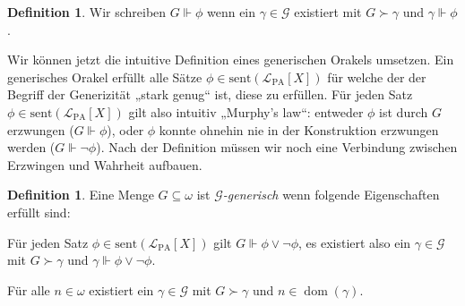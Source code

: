 \documentclass[nofonts]{uebung}
\theoremstyle{definition}
\newtheorem{definition}[theorem]{Definition}
\DeclareMathOperator{\dom}{dom}
\begin{document}
\begin{definition}
    Wir schreiben $G\Vdash \phi$ wenn ein $\gamma\in \mathcal G$ existiert mit $G\succ \gamma$ und $\gamma\Vdash\phi$.
\end{definition}

Wir können jetzt die intuitive Definition eines generischen Orakels umsetzen. Ein generisches Orakel erfüllt alle Sätze $\phi\in \mathrm{sent}(\mathcal L_{\mathrm{PA}}[X])$ für welche der der Begriff der Generizität „stark genug“ ist, diese zu erfüllen. Für jeden Satz $\phi\in \mathrm{sent}(\mathcal L_{\mathrm{PA}}[X])$ gilt also intuitiv „Murphy's law“: entweder $\phi$ ist durch $G$ erzwungen ($G\Vdash \phi$), oder $\phi$ konnte ohnehin nie in der Konstruktion erzwungen werden ($G\Vdash \neg\phi$).
Nach der Definition müssen wir noch eine Verbindung zwischen Erzwingen und Wahrheit aufbauen.

\begin{definition}
    Eine Menge $G\subseteq\omega$ ist \emph{$\mathcal G$-generisch} wenn folgende Eigenschaften erfüllt sind:
    \begin{thmenum}
        \item\label{def:genorakel-forcing} Für jeden Satz $\phi\in \mathrm{sent}(\mathcal L_{\mathrm{PA}}[X])$ gilt $G\Vdash \phi\lor\neg\phi$, es existiert also ein $\gamma\in\mathcal G$ mit $G\succ \gamma$ und $\gamma\Vdash \phi\lor\neg\phi$.

        \item\label{def:genorakel-vollst} Für alle $n\in\omega$ existiert ein $\gamma\in\mathcal G$ mit $G\succ\gamma$ und $n\in\dom(\gamma)$.
    \end{thmenum}
\end{definition}
\end{document}

